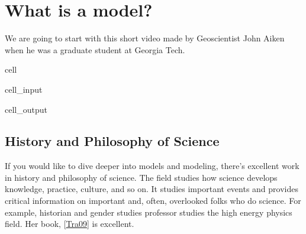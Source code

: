 \documentclass[letterpaper,10pt,english]{jupyterBook}
\begin{document}
\section{What is a model?}
\label{\detokenize{content/1_mechanics/modeling/activity-what_is_a_model:what-is-a-model}}
\sphinxAtStartPar
We are going to start with this short video made by Geoscientist John Aiken when he was a graduate student at Georgia Tech.

\begin{sphinxuseclass}{cell}\begin{sphinxVerbatimInput}

\begin{sphinxuseclass}{cell_input}
\begin{sphinxVerbatim}[commandchars=\\\{\}]
   
      
\end{sphinxVerbatim}

\end{sphinxuseclass}\end{sphinxVerbatimInput}
\begin{sphinxVerbatimOutput}

\begin{sphinxuseclass}{cell_output}
\noindent{}

\end{sphinxuseclass}\end{sphinxVerbatimOutput}

\end{sphinxuseclass}

\subsection{History and Philosophy of Science}
\label{\detokenize{content/1_mechanics/modeling/activity-what_is_a_model:history-and-philosophy-of-science}}
\sphinxAtStartPar
If you would like to dive deeper into models and modeling, there’s excellent work in history and philosophy of science. The field studies how science develops knowledge, practice, culture, and so on. It studies important events and provides critical information on important and, often, overlooked folks who do science. For example, historian and gender studies professor  studies the high energy physics field. Her book,  {[}\hyperlink{cite.jb_reference/markdown:id5}{Tra09}{]} is excellent.
\end{document}
